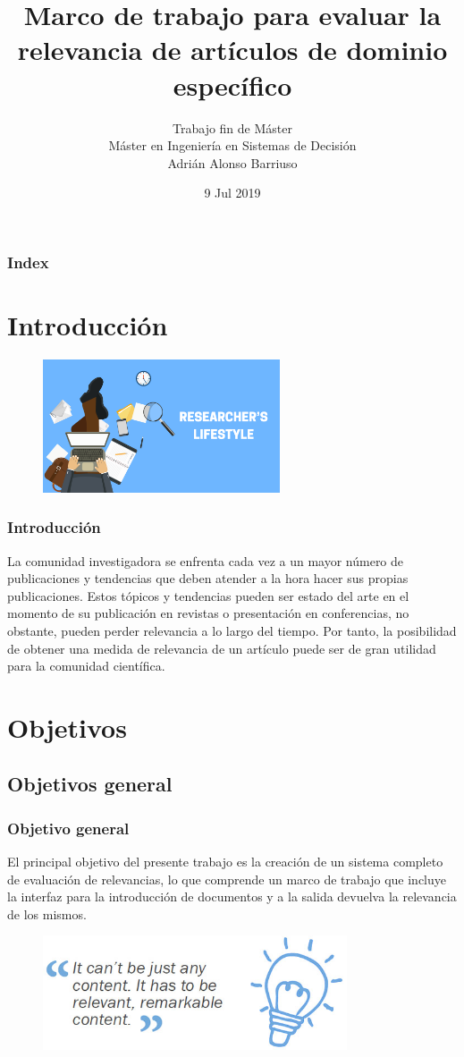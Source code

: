 \documentclass[10pt,fleqn]{beamer}
\institute[]{}
\author[Adrián Alonso Barriuso]{Trabajo fin de Máster\\
\vspace{0.5cm}Máster en Ingeniería en Sistemas de Decisión \\ \vspace{1cm}
\scriptsize{Adrián Alonso Barriuso}}
\title[URJC]{Marco de trabajo para evaluar la relevancia de artículos de dominio específico}
\date[Jul 2019]{9 Jul 2019}
\begin{document}
\begin{frame}
  \titlepage
\end{frame}

\begin{frame}
\frametitle{Index}
\tableofcontents
\end{frame}

\section{Introducción}
\begin{frame}
\begin{figure}
  \centering
  \includegraphics[width=7cm, keepaspectratio]{images/rese.png}
\end{figure}
  \frametitle{Introducción}
La comunidad investigadora se enfrenta cada vez a un mayor número de publicaciones y tendencias que deben atender a la hora hacer sus propias publicaciones. Estos tópicos y tendencias pueden ser estado del arte en el momento de su publicación en revistas o presentación en conferencias, no obstante, pueden perder relevancia a lo largo del tiempo. Por tanto, la posibilidad de obtener una medida de relevancia de un artículo puede ser de gran utilidad para la comunidad científica.
\end{frame}

\section{Objetivos}
\subsection{Objetivos general}
\begin{frame}\frametitle{Objetivo general} 
El principal objetivo del presente trabajo es la creación de un sistema completo de evaluación
de relevancias, lo que comprende un marco de trabajo que incluye la interfaz para la introducción de documentos y a la salida devuelva la relevancia de los mismos.

\begin{figure}  \centering
  \includegraphics[width=9cm, keepaspectratio]{relevant-content.jpg}
\end{figure}
\end{frame}
\end{document}
